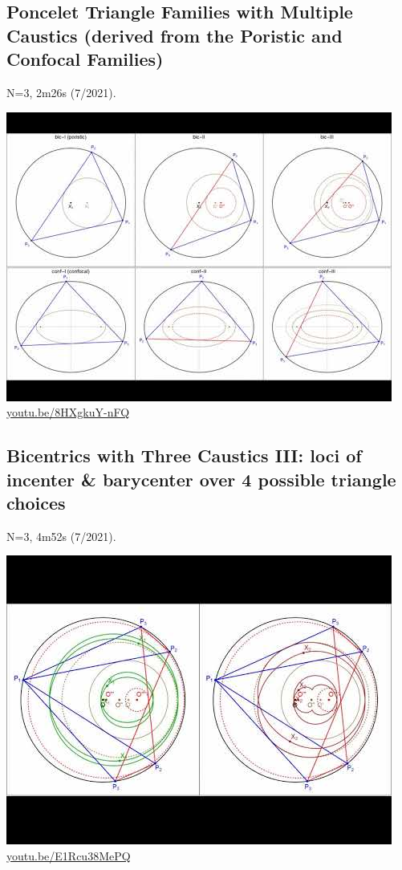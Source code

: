 \documentclass[12pt]{amsart}
\begin{document}
\subsection{Poncelet Triangle Families with Multiple Caustics (derived from the Poristic and Confocal Families)}
\label{vid:8HXgkuY-nFQ}
\noindent N=3, 2m26s (7/2021). 
\begin{center}\includegraphics[width=.5\textwidth]{pics/8HXgkuY-nFQ.jpg} \\ 
\href{https://youtu.be/8HXgkuY-nFQ}{\url{youtu.be/8HXgkuY-nFQ}}\end{center}
% 

\subsection{Bicentrics with Three Caustics III: loci of incenter \& barycenter over 4 possible triangle choices}
\label{vid:E1Rcu38MePQ}
\noindent N=3, 4m52s (7/2021). 
\begin{center}\includegraphics[width=.5\textwidth]{pics/E1Rcu38MePQ.jpg} \\ 
\href{https://youtu.be/E1Rcu38MePQ}{\url{youtu.be/E1Rcu38MePQ}}\end{center}
% 
\end{document}
